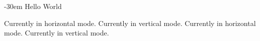 \documentclass[12pt]{article}
\newcommand{\scale}[2]{%
    \scalebox{#1}[#1]{#2}}
\begin{document}
\leavevmode\kern-30em{   
    \textcolor{gray}{
    \rotatebox{12}{
        \scale{60}{$\displaystyle\int$}
    }}
}
%
%
Hello \leavevmode World

\ifhmode
  Currently in horizontal mode.
\else\ifvmode
  Currently in vertical mode.
\fi\fi
\ifhmode
  Currently in horizontal mode.
\else\ifvmode
  Currently in vertical mode.
\fi\fi
\end{document}
